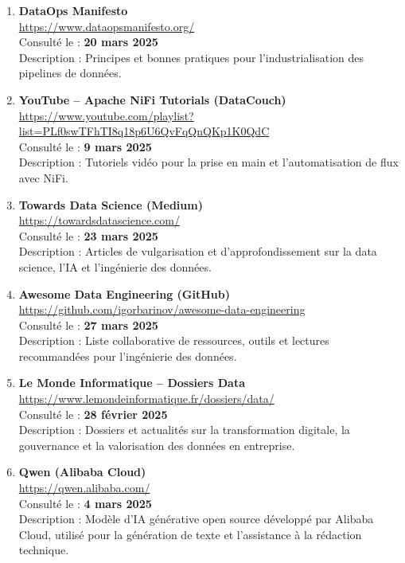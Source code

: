 \begin{enumerate}
    \item \textbf{DataOps Manifesto} \\
    \url{https://www.dataopsmanifesto.org/} \\
    Consulté le : \textbf{20 mars 2025} \\
    Description : Principes et bonnes pratiques pour l’industrialisation des pipelines de données.

    \item \textbf{YouTube – Apache NiFi Tutorials (DataCouch)} \\
    \url{https://www.youtube.com/playlist?list=PLf0swTFhTI8q18p6U6QvFqQnQKp1K0QdC} \\
    Consulté le : \textbf{9 mars 2025} \\
    Description : Tutoriels vidéo pour la prise en main et l’automatisation de flux avec NiFi.

    \item \textbf{Towards Data Science (Medium)} \\
    \url{https://towardsdatascience.com/} \\
    Consulté le : \textbf{23 mars 2025} \\
    Description : Articles de vulgarisation et d’approfondissement sur la data science, l’IA et l’ingénierie des données.

    \item \textbf{Awesome Data Engineering (GitHub)} \\
    \url{https://github.com/igorbarinov/awesome-data-engineering} \\
    Consulté le : \textbf{27 mars 2025} \\
    Description : Liste collaborative de ressources, outils et lectures recommandées pour l’ingénierie des données.

    \item \textbf{Le Monde Informatique – Dossiers Data} \\
    \url{https://www.lemondeinformatique.fr/dossiers/data/} \\
    Consulté le : \textbf{28 février 2025} \\
    Description : Dossiers et actualités sur la transformation digitale, la gouvernance et la valorisation des données en entreprise.

    \item \textbf{Qwen (Alibaba Cloud)} \\
    \url{https://qwen.alibaba.com/} \\
    Consulté le : \textbf{4 mars 2025} \\
    Description : Modèle d’IA générative open source développé par Alibaba Cloud, utilisé pour la génération de texte et l’assistance à la rédaction technique.


\end{enumerate}
